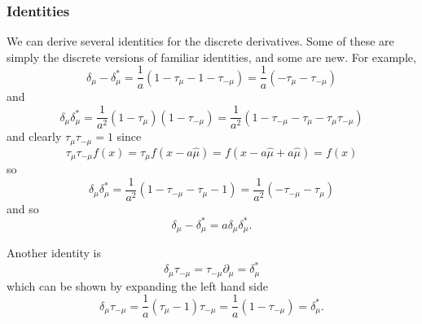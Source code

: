 \documentclass[fleqn]{NotesClass}
\newcommand{\forwardDerivative}{\delta}
\newcommand{\backwardDerivative}{\delta^*}
\begin{document}
    \subsubsection{Identities}
    We can derive several identities for the discrete derivatives.
    Some of these are simply the discrete versions of familiar identities, and some are new.
    For example,
    \begin{equation}
        \forwardDerivative_\mu - \backwardDerivative_\mu = \frac{1}{a}(1 - \tau_\mu - 1 - \tau_{-\mu}) = \frac{1}{a}(-\tau_\mu - \tau_{-\mu})
    \end{equation}
    and
    \begin{equation}
        \forwardDerivative_\mu \backwardDerivative_\mu = \frac{1}{a^2}(1 - \tau_\mu)(1 - \tau_{-\mu}) = \frac{1}{a^2}(1 - \tau_{-\mu} - \tau_\mu - \tau_\mu\tau_{-\mu})
    \end{equation}
    and clearly \(\tau_\mu \tau_{-\mu} = 1\) since
    \begin{equation}
        \tau_\mu \tau_{-\mu} f(x) = \tau_\mu f(x - a\hat{\mu}) = f(x - a\hat{\mu} + a\hat{\mu}) = f(x)
    \end{equation}
    so
    \begin{equation}
        \forwardDerivative_\mu \backwardDerivative_\mu = \frac{1}{a^2}(1 - \tau_{-\mu} - \tau_\mu - 1) = \frac{1}{a^2}(- \tau_{-\mu} - \tau_\mu)
    \end{equation}
    and so
    \begin{equation}
        \forwardDerivative_\mu - \backwardDerivative_\mu = a\forwardDerivative_\mu\backwardDerivative_\mu.
    \end{equation}
    
    Another identity is
    \begin{equation}
        \forwardDerivative_\mu \tau_{-\mu} = \tau_{-\mu}\partial_\mu = \backwardDerivative_\mu
    \end{equation}
    which can be shown by expanding the left hand side
    \begin{equation}
        \forwardDerivative_\mu \tau_{-\mu} = \frac{1}{a}(\tau_\mu - 1)\tau_{-\mu} = \frac{1}{a}(1 - \tau_{-\mu}) = \backwardDerivative_\mu.
    \end{equation}
    
\end{document}
